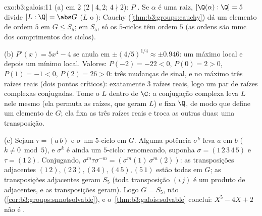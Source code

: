 \begin{solution}{exo:b3:galois:11}
(a)  em $2$ ($2 \mid 4, 2$; $4 \nmid 2$): $P$
. Se $\alpha$ é uma raiz, $[\Q(\alpha):\Q] = 5$
divide $[L:\Q] = \abs G$ ($L$ o ): Cauchy
(\cref{thm:b3:groups:cauchy}) dá um elemento de ordem $5$ em
$G \leq S_5$; em $S_5$, só os $5$-ciclos têm ordem $5$ (as ordens
são mmc dos comprimentos dos ciclos).

(b) $P'(x) = 5x^4 - 4$ se anula em $\pm(4/5)^{1/4} \approx \pm
0.946$: um máximo local e depois um mínimo local. Valores: $P(-2)
= -22 < 0$, $P(0) = 2 > 0$, $P(1) = -1 < 0$, $P(2) = 26 > 0$:
três mudanças de sinal, e no máximo três raízes reais (dois pontos
críticos): exatamente $3$ raízes reais, logo um par de raízes
complexas conjugadas. Tome o  $L$ dentro de $\C$:
a conjugação complexa leva $L$ nele mesmo (ela permuta as raízes,
que geram $L$) e fixa $\Q$, de modo que define um elemento de
$G$; ela fixa as três raízes reais e troca as outras duas: uma
transposição.

(c) Sejam $\tau = (a\,b)$ e $\sigma$ um $5$-ciclo em $G$. Alguma
potência $\sigma^k$ leva $a$ em $b$ ($k \ne 0 \bmod 5$), e
$\sigma^k$ é ainda um $5$-ciclo: renomeando, suponha $\sigma =
(1\,2\,3\,4\,5)$ e $\tau = (1\,2)$. Conjugando,
$\sigma^m\tau\sigma^{-m} = (\sigma^m(1)\ \sigma^m(2))$: as
transposições adjacentes $(1\,2), (2\,3), (3\,4), (4\,5),
(5\,1)$ estão todas em $G$; as transposições adjacentes geram $S_5$
(toda transposição $(i\,j)$ é um produto de adjacentes,
e as transposições geram). Logo $G = S_5$, não 
(\cref{cor:b3:groups:snnotsolvable}), e o~\cref{thm:b3:galois:solvable} conclui: $X^5 - 4X + 2$ não é
.
\end{solution}

